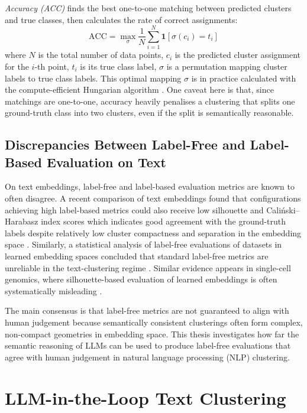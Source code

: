 \documentclass[11pt,a4paper,oneside]{report}
\begin{document}
\emph{Accuracy (ACC)} finds the best one-to-one matching between predicted clusters and true classes, then calculates the rate of correct assignments:
\begin{equation}
\mathrm{ACC} = \max_{\sigma} \frac{1}{N}\sum_{i=1}^{N} \mathbf{1}\!\left[ \sigma(c_i) = t_i \right]
\end{equation}
where $N$ is the total number of data points, $c_i$ is the predicted cluster assignment for the $i$-th point, $t_i$ is its true class label, $\sigma$ is a permutation mapping cluster labels to true class labels. This optimal mapping $\sigma$ is in practice calculated with the compute-efficient Hungarian algorithm \citep{kuhn1955hungarian}. One caveat here is that, since matchings are one-to-one, accuracy heavily penalises a clustering that splits one ground-truth class into two clusters, even if the split is semantically reasonable.

\subsection{Discrepancies Between Label-Free and Label-Based Evaluation on Text}\label{sec:discrepancies}

On text embeddings, label-free and label-based evaluation metrics are known to often disagree. A recent comparison of text embeddings found that configurations achieving high label-based metrics could also receive low silhouette and Cali\'nski--Harabasz index scores which indicates good agreement with the ground-truth labels despite relatively low cluster compactness and separation in the embedding space \citep{petukhova2025text}. Similarly, a statistical analysis of label-free evaluations of datasets in learned embedding spaces concluded that standard label-free metrics are unreliable in the text-clustering regime \citep{wang2025deep}. Similar evidence appears in single-cell genomics, where silhouette-based evaluation of learned embeddings is often systematically misleading \citep{rautenstrauch2025shortcomings}.

The main consensus is that label-free metrics are not guaranteed to align with human judgement because semantically consistent clusterings often form complex, non-compact geometries in embedding space. This thesis investigates how far the semantic reasoning of LLMs can be used to produce label-free evaluations that agree with human judgement in natural language processing (NLP) clustering.

\section{LLM-in-the-Loop Text Clustering}\label{sec:llmloop}
\end{document}

